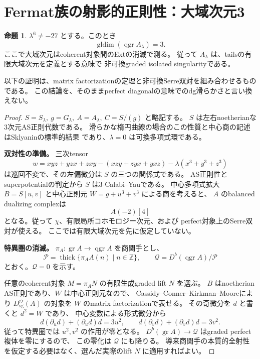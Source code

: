 \documentclass[a4paper,11pt]{ltjsarticle}
\theoremstyle{definition}
\newtheorem{theorem}{命題}[section]
\newcommand{\qgr}{\operatorname{qgr}}
\newcommand{\Dsg}{D_{\mathrm{sg}}}
\begin{document}
\section{Fermat族の射影的正則性：大域次元3}

\begin{theorem}\label{thm:smooth}
$\lambda^6\ne-27$ とする。このとき
\[
 \operatorname{gldim}(\qgr A_\lambda)=3.
\]
ここで大域次元はcoherent対象間のExtの消滅で測る。
従って $A_\lambda$ は、tailsの有限大域次元を定義とする意味で
非可換graded isolated singularityである。
\end{theorem}

以下の証明は、matrix factorizationの定理と非可換Serre双対を組み合わせるものである。
この結論を、そのままperfect diagonalの意味でのdg滑らかさと言い換えない。

\begin{proof}
$S=S_\lambda,\ g=G_\lambda,\ A=A_\lambda,\ C=S/(g)$ と略記する。
$S$ は左右noetherianな3次元AS正則代数である。
滑らかな楕円曲線の場合のこの性質と中心商の記述はSklyaninの標準的結果
\cite[Section 2.3]{WWY}であり、$\lambda=0$ は可換多項式環である。

\textbf{双対性の準備。}
三次tensor
\[
 w=xyz+yzx+zxy-(xzy+zyx+yxz)-\lambda(x^3+y^3+z^3)
\]
は巡回不変で、その左偏微分は $S$ の三つの関係式である。
AS正則性とsuperpotentialの判定\cite[Lemma 2.15]{IM}から $S$ は3-Calabi--Yauである。
中心多項式拡大 $B=S[u,v]$ と中心正則元 $W=g+u^3+v^3$ による商を考えると、
$A$ のbalanced dualizing complexは
\[
 A(-2)[4]
\]
となる。従って $\chi$、有限局所コホモロジー次元、および
perfect対象上のSerre双対が使える\cite[Theorem 4.2, Corollary 4.3]{YZ}。
ここでは有限大域次元を先に仮定していない。

\textbf{特異圏の消滅。}
$\pi_A:\operatorname{gr}A\to\qgr A$ を商関手とし、
\[
 \mathcal P=\operatorname{thick}\{\pi_AA(n)\mid n\in\mathbb Z\},
 \qquad \mathcal Q=D^b(\qgr A)/\mathcal P
\]
とおく。$\mathcal Q=0$ を示す。

任意のcoherent対象 $M=\pi_A N$ の有限生成graded lift $N$ を選ぶ。
$B$ はnoetherian AS正則であり、$W$ は中心正則元なので、
Cassidy--Conner--Kirkman--Moore\cite[Theorems 4.7, 5.5]{CCKM}により
$\Dsg^{\mathrm{gr}}(A)$ の対象を $W$ のmatrix factorizationで表せる。
その奇微分を $d$ と書くと $d^2=W$ であり、
中心変数による形式微分から
\[
 d(\partial_ud)+(\partial_ud)d=3u^2,\qquad
 d(\partial_vd)+(\partial_vd)d=3v^2.
\]
従って特異圏では $u^2,v^2$ の作用が零となる。
$D^b(\operatorname{gr}A)\to\mathcal Q$ はgraded perfect複体を零にするので、
この零化は $\mathcal Q$ にも降りる。
導来商関手の本質的全射性を仮定する必要はなく、選んだ実際のlift $N$ に適用すればよい。


\end{proof}
\end{document}
